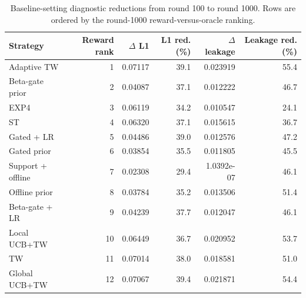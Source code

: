 \begin{table}[t]
\centering
\caption{Baseline-setting diagnostic reductions from round 100 to round 1000. Rows are ordered by the round-1000 reward-versus-oracle ranking.}
\label{tab:baseline_setting_checkpoint_reductions}
\begin{tabular}{lrrrrr}
\toprule
Strategy & Reward rank & $\Delta$ L1 & L1 red. (\%) & $\Delta$ leakage & Leakage red. (\%) \\
\midrule
Adaptive TW & 1 & 0.07117 & 39.1 & 0.023919 & 55.4 \\
Beta-gate prior & 2 & 0.04087 & 37.1 & 0.012222 & 46.7 \\
EXP4 & 3 & 0.06119 & 34.2 & 0.010547 & 24.1 \\
ST & 4 & 0.06320 & 37.1 & 0.015615 & 36.7 \\
Gated + LR & 5 & 0.04486 & 39.0 & 0.012576 & 47.2 \\
Gated prior & 6 & 0.03854 & 35.5 & 0.011805 & 45.5 \\
Support + offline & 7 & 0.02308 & 29.4 & 1.0392e-07 & 46.1 \\
Offline prior & 8 & 0.03784 & 35.2 & 0.013506 & 51.4 \\
Beta-gate + LR & 9 & 0.04239 & 37.7 & 0.012047 & 46.1 \\
Local UCB+TW & 10 & 0.06449 & 36.7 & 0.020952 & 53.7 \\
TW & 11 & 0.07014 & 38.0 & 0.018581 & 51.0 \\
Global UCB+TW & 12 & 0.07067 & 39.4 & 0.021871 & 54.4 \\
\bottomrule
\end{tabular}
\end{table}

